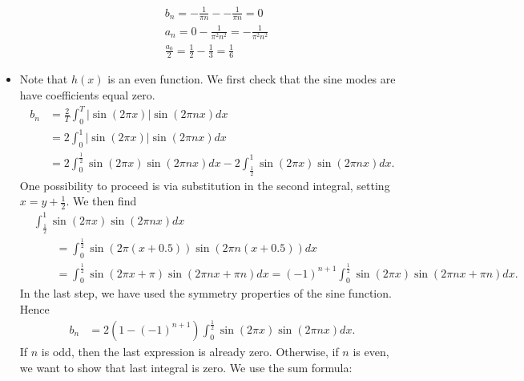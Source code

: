 \documentclass[11pt]{article}
\begin{document}
\begin{solution}
\begin{itemize}
\begin{align*}
                    &b_n = -\frac{1}{\pi n} - - \frac{1}{\pi n} = 0
                    \\& 
            a_n = 0 - \frac{1}{\pi^2 n^2} =  - \frac{1}{\pi^2 n^2} 
                    \\&
            \frac{a_0}{2} = \frac{1}{2} - \frac{1}{3} = \frac{1}{6}
        \end{align*}	
        \item
        Note that $h(x)$ is an even function.
        We first check that the sine modes are have coefficients equal zero.
        \begin{align*}
            b_n 
            &
            = 
            \frac{2}{T}
            \int_{0}^{T} |\sin( 2\pi x)| \sin(2\pi n x) dx
            \\&
            =
            2
            \int_{0}^{1} |\sin( 2\pi x)| \sin(2\pi n x) dx
            \\&
            =
            2
            \int_{0}^{\frac 1 2} \sin( 2\pi x) \sin(2\pi n x) dx
            -
            2
            \int_{\frac 1 2}^{1} \sin( 2\pi x) \sin(2\pi n x) dx
            .            
        \end{align*}
        One possibility to proceed is via substitution in the second integral, setting $x = y + \frac 1 2$. 
        We then find 
        \begin{align*}
            &
            \int_{\frac 1 2}^{1} 
            \sin( 2\pi x) \sin(2\pi n x) dx
            \\&\qquad 
            =
            \int_{0}^{\frac 1 2} 
            \sin( 2\pi (x+ 0.5)) \sin(2\pi n (x+ 0.5)) dx
            \\&\qquad 
            =
            \int_{0}^{\frac 1 2} 
            \sin( 2\pi x + \pi ) \sin(2\pi n x + \pi n) dx
            =
            (-1)^{n+1}
            \int_{0}^{\frac 1 2} 
            \sin( 2\pi x ) \sin(2\pi n x + \pi n) dx
            .
        \end{align*}
        In the last step, we have used the symmetry properties of the sine function. 
        Hence 
        \begin{align*}
            b_n 
            &
            =
            2 \left( 1 - (-1)^{n+1} \right)
            \int_{0}^{\frac 1 2} \sin( 2\pi x) \sin(2\pi n x) dx
            .
        \end{align*}
        If $n$ is odd, then the last expression is already zero. 
        Otherwise, if $n$ is even, we want to show that last integral is zero. 
        We use the sum formula:

\end{itemize}
\end{solution}
\end{document}
